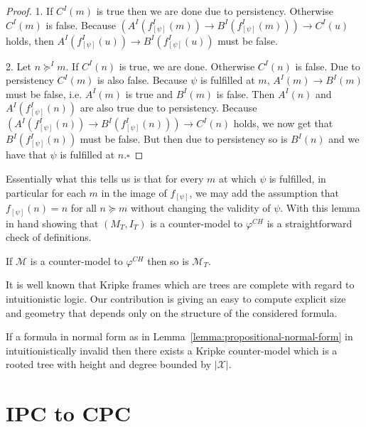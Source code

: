 \documentclass[runningheads]{llncs}
\begin{document}
\begin{proof}
	1. If $C^I(m)$ is true then we are done due to persistency. Otherwise $C^I(m)$ is false.
	Because $(A^I(f_{[\psi]}^I(m))\to B^I(f_{[\psi]}^I(m)))\to C^I(u)$ holds, then $A^I(f_{[\psi]}^I(u))\to B^I(f_{[\psi]}^I(u))$ must be false.
	
	
	2. Let $n\succeq^I m$.
	If $C^I(n)$ is true, we are done.
	Otherwise $C^I(n)$ is false.
	Due to persistency $C^I(m)$ is also false.
	Because $\psi$ is fulfilled at $m$, $A^I(m)\to B^I(m)$ must be false, i.e. $A^I(m)$ is true and $B^I(m)$ is false. Then $A^I(n)$ and $A^I(f^I_{[\psi]}(n))$ are also true due to persistency.
	Because $(A^I(f^I_{[\psi]}(n))\to B^I(f^I_{[\psi]}(n)))\to C^I(n)$ holds, we now get that  $B^I(f^I_{[\psi]}(n))$ must be false.
	But then due to persistency so is $B^I(n)$ and we have that $\psi$ is fulfilled at $n$.\hfill$\square$
\end{proof}

Essentially what this tells us is that for every $m$ at which $\psi$ is fulfilled, in particular for each $m$ in the image of $f_{[\psi]}$, we may add the assumption that $f_{[\psi]}(n) = n$ for all $n\succeq m$ without changing the validity of $\psi$. With this lemma in hand showing that $(M_T, I_T)$ is a counter-model to $\varphi^{CH}$ is a straightforward check of definitions.

\begin{corollary}\label{cor:prop-tree-model}
	If $\mathcal M$ is a counter-model to $\varphi^{CH}$ then so is $\mathcal M_T$.
\end{corollary}

\begin{remark}
	It is well known that Kripke frames which are trees are complete with regard to intuitionistic logic. Our contribution is giving an easy to compute explicit size and geometry that depends only on the structure of the considered formula.
\end{remark}

\begin{corollary}
	If a formula in normal form as in Lemma~\ref{lemma:propositional-normal-form} in intuitionistically invalid then there exists a Kripke counter-model which is a rooted tree with height and degree bounded by $|\mathcal X|$.
\end{corollary}

\section{IPC to CPC}
\end{document}
